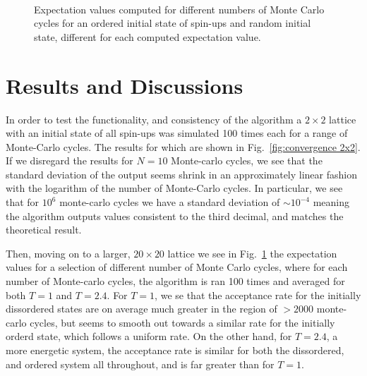 \documentclass[10pt,showpacs,preprintnumbers,amsmath,amssymb,nofootinbib,aps,prl,twocolumn,groupedaddress,superscriptaddress,showkeys]{revtex4-1}
\begin{document}
\begin{figure}[h!p]
{    }
    \\
    \caption{\label{fig:20x20 expecvals} Expectation values computed for different numbers of Monte Carlo cycles for an ordered initial state of spin-ups and random initial state, different for each computed expectation value.}
  \end{figure}
  \section{Results and Discussions}

  In order to test the functionality, and consistency of the algorithm a $2\times2$ lattice with an initial state of all spin-ups was simulated 100 times each for a range of Monte-Carlo cycles. The results for which are shown in Fig.~\ref{fig:convergence 2x2}. If we disregard the results for $N=10$ Monte-carlo cycles, we see that the standard deviation of the output seems shrink in an approximately linear fashion with the logarithm of the number of Monte-Carlo cycles. In particular, we see that for $10^6$ monte-carlo cycles we have a standard deviation of $\sim10^{-4}$ meaning the algorithm outputs values consistent to the third decimal, and matches the theoretical result.

  Then, moving on to a larger, $20\times20$ lattice we see in Fig.~\ref{fig:20x20 expecvals} the expectation values for a selection of different number of Monte Carlo cycles, where for each number of Monte-carlo cycles, the algorithm is ran 100 times and averaged for both $T=1$ and $T=2.4$. For $T=1$, we se that the acceptance rate for the initially dissordered states are on average much greater in the region of $>2000$ monte-carlo cycles, but seems to smooth out towards a similar rate for the initially orderd state, which follows a uniform rate. On the other hand, for $T=2.4$, a more energetic system, the acceptance rate is similar for both the dissordered, and ordered system all throughout, and is far greater than for $T=1$.
\end{document}
